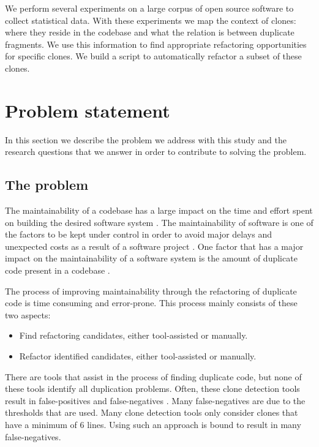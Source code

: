 We perform several experiments on a large corpus of open source software to collect statistical data. With these experiments we map the context of clones: where they reside in the codebase and what the relation is between duplicate fragments. We use this information to find appropriate refactoring opportunities for specific clones. We build a script to automatically refactor a subset of these clones.

\section{Problem statement}
In this section we describe the problem we address with this study and the research questions that we answer in order to contribute to solving the problem.

\subsection{The problem}
The maintainability of a codebase has a large impact on the time and effort spent on building the desired software system \cite{bakota2012cost, munson1978software}. The maintainability of software is one of the factors to be kept under control in order to avoid major delays and unexpected costs as a result of a software project \cite{fowler2018refactoring}. One factor that has a major impact on the maintainability of a software system is the amount of duplicate code present in a codebase \cite{heitlager2007practical, fowler1999refactoring}.

The process of improving maintainability through the refactoring of duplicate code is time consuming and error-prone. This process mainly consists of these two aspects:
\begin{itemize}
	\item Find refactoring candidates, either tool-assisted or manually.
	\item Refactor identified candidates, either tool-assisted or manually.
\end{itemize}
There are tools that assist in the process of finding duplicate code, but none of these tools identify all duplication problems. Often, these clone detection tools result in false-positives and false-negatives \cite{roy2007survey}. Many false-negatives are due to the thresholds that are used. Many clone detection tools \cite{sajnani2016sourcerercc, svajlenko2016bigcloneeval} only consider clones that have a minimum of 6 lines. Using such an approach is bound to result in many false-negatives.

